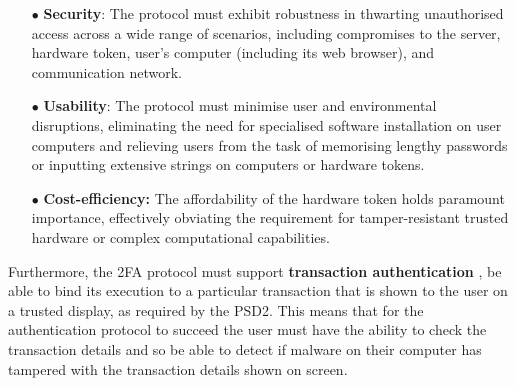 \begin{itemize}[leftmargin=4.6mm]

\item[$\bullet$]\textbf{Security}: The protocol must exhibit robustness in thwarting unauthorised access across a wide range of scenarios, including compromises to the server, hardware token, user's computer (including its web browser), and communication network.



\item[$\bullet$]\textbf{Usability}: The protocol must minimise user and environmental disruptions, eliminating the need for specialised software installation on user computers and relieving users from the task of memorising lengthy passwords or inputting extensive strings on computers or hardware tokens.

%

\item[$\bullet$]\textbf{Cost-efficiency:} The affordability of the hardware token holds paramount importance, effectively obviating the requirement for tamper-resistant trusted hardware or complex computational capabilities.



\end{itemize}

Furthermore, the 2FA protocol must support \textbf{transaction authentication} \ie, be able to bind its execution to a particular transaction that is shown to the user on a trusted display, as required by the PSD2.
This means that for the authentication protocol to succeed the user must have the ability to check the transaction details and so be able to detect if malware on their computer has tampered with the transaction details shown on screen.



